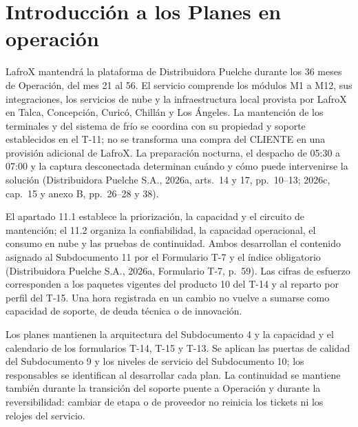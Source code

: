 \chapter{Introducción a los Planes en operación}
\label{cap:sd11}

LafroX mantendrá la plataforma de Distribuidora Puelche durante los 36 meses de Operación, del mes 21 al 56. El servicio comprende los módulos M1 a M12, sus integraciones, los servicios de nube y la infraestructura local provista por LafroX en Talca, Concepción, Curicó, Chillán y Los Ángeles. La mantención de los terminales y del sistema de frío se coordina con su propiedad y soporte establecidos en el T-11; no se transforma una compra del CLIENTE en una provisión adicional de LafroX. La preparación nocturna, el despacho de 05:30 a 07:00 y la captura desconectada determinan cuándo y cómo puede intervenirse la solución (Distribuidora Puelche S.A., 2026a, arts.~14 y 17, pp.~10--13; 2026c, cap.~15 y anexo B, pp.~26--28 y 38).

El apartado 11.1 establece la priorización, la capacidad y el circuito de mantención; el 11.2 organiza la confiabilidad, la capacidad operacional, el consumo en nube y las pruebas de continuidad. Ambos desarrollan el contenido asignado al Subdocumento 11 por el Formulario T-7 y el índice obligatorio (Distribuidora Puelche S.A., 2026a, Formulario T-7, p.~59). Las cifras de esfuerzo corresponden a los paquetes vigentes del producto 10 del T-14 y al reparto por perfil del T-15. Una hora registrada en un cambio no vuelve a sumarse como capacidad de soporte, de deuda técnica o de innovación.

Los planes mantienen la arquitectura del Subdocumento 4 y la capacidad y el calendario de los formularios T-14, T-15 y T-13. Se aplican las puertas de calidad del Subdocumento 9 y los niveles de servicio del Subdocumento 10; los responsables se identifican al desarrollar cada plan. La continuidad se mantiene también durante la transición del soporte puente a Operación y durante la reversibilidad: cambiar de etapa o de proveedor no reinicia los tickets ni los relojes del servicio.

